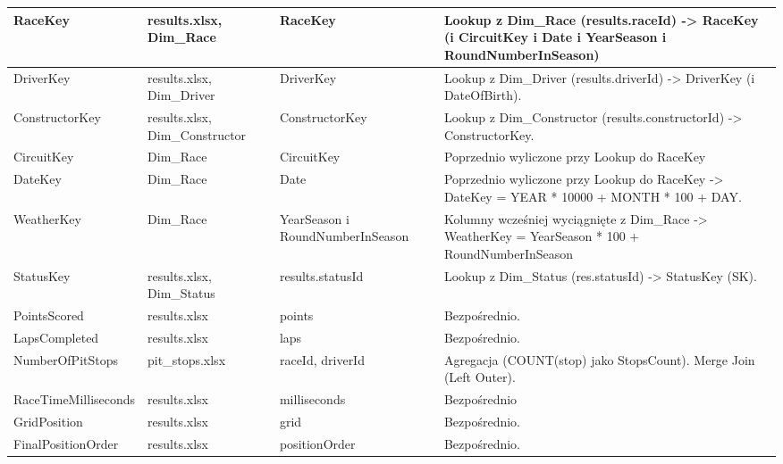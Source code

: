 \documentclass[a4paper,12pt]{article}
\begin{document}
\begin{footnotesize}
\begin{longtable}{|L{3.5cm}|L{3.5cm}|L{3cm}|L{7cm}|}
    RaceKey              & results.xlsx, Dim\_Race        & RaceKey                          & Lookup z Dim\_Race (results.raceId) -> RaceKey (i CircuitKey i Date i YearSeason i RoundNumberInSeason)
    \\
    \hline
    DriverKey            & results.xlsx, Dim\_Driver      & DriverKey                        & Lookup z Dim\_Driver (results.driverId) -> DriverKey (i DateOfBirth).
    \\
    \hline
    ConstructorKey       & results.xlsx, Dim\_Constructor & ConstructorKey                   & Lookup z Dim\_Constructor (results.constructorId) -> ConstructorKey.
    \\
    \hline
    CircuitKey           & Dim\_Race                      & CircuitKey                       & Poprzednio wyliczone przy Lookup do RaceKey
    \\
    \hline
    DateKey              & Dim\_Race                      & Date                             & Poprzednio wyliczone przy Lookup do RaceKey -> DateKey = YEAR * 10000 + MONTH * 100 + DAY.              \\
    \hline
    WeatherKey           & Dim\_Race                      & YearSeason i RoundNumberInSeason & Kolumny wcześniej wyciągnięte z Dim\_Race -> WeatherKey = YearSeason * 100 + RoundNumberInSeason
    \\
    \hline
    StatusKey            & results.xlsx, Dim\_Status      & results.statusId                 & Lookup z Dim\_Status (res.statusId) -> StatusKey (SK).
    \\
    \hline
    PointsScored         & results.xlsx                   & points                           & Bezpośrednio.
    \\
    \hline
    LapsCompleted        & results.xlsx                   & laps                             & Bezpośrednio.
    \\
    \hline
    NumberOfPitStops     & pit\_stops.xlsx                & raceId, driverId                 & Agregacja (COUNT(stop) jako StopsCount). Merge Join (Left Outer).                                       \\
    \hline
    RaceTimeMilliseconds & results.xlsx                   & milliseconds                     & Bezpośrednio
    \\
    \hline
    GridPosition         & results.xlsx                   & grid                             & Bezpośrednio.
    \\
    \hline
    FinalPositionOrder   & results.xlsx                   & positionOrder                    & Bezpośrednio.

\end{longtable}
\end{footnotesize}
\end{document}
